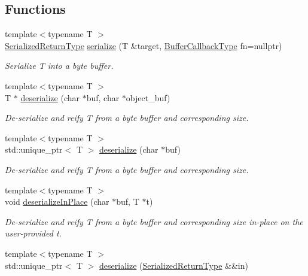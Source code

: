 \subsection*{Functions}
\begin{DoxyCompactItemize}
\item 
{\footnotesize template$<$typename T $>$ }\\\hyperlink{namespacecheckpoint_aa61e2b491f405a63a394f9aad528c37a}{Serialized\+Return\+Type} \hyperlink{namespacecheckpoint_a075da4e7344cf037943362517e606c3a}{serialize} (T \&target, \hyperlink{namespacecheckpoint_a70bc1b37eae8e32129df38d981ef90f6}{Buffer\+Callback\+Type} fn=nullptr)
\begin{DoxyCompactList}\small\item\em Serialize {\ttfamily T} into a byte buffer. \end{DoxyCompactList}\item 
{\footnotesize template$<$typename T $>$ }\\T $\ast$ \hyperlink{namespacecheckpoint_aee0d7387d339b0275e9b95634748d63b}{deserialize} (char $\ast$buf, char $\ast$object\+\_\+buf)
\begin{DoxyCompactList}\small\item\em De-\/serialize and reify {\ttfamily T} from a byte buffer and corresponding {\ttfamily size}. \end{DoxyCompactList}\item 
{\footnotesize template$<$typename T $>$ }\\std\+::unique\+\_\+ptr$<$ T $>$ \hyperlink{namespacecheckpoint_ab8beefac6b3dc40c69e11dc430618c64}{deserialize} (char $\ast$buf)
\begin{DoxyCompactList}\small\item\em De-\/serialize and reify {\ttfamily T} from a byte buffer and corresponding {\ttfamily size}. \end{DoxyCompactList}\item 
{\footnotesize template$<$typename T $>$ }\\void \hyperlink{namespacecheckpoint_af605968a3b8731448c68e5c9fff917ee}{deserialize\+In\+Place} (char $\ast$buf, T $\ast$t)
\begin{DoxyCompactList}\small\item\em De-\/serialize and reify {\ttfamily T} from a byte buffer and corresponding {\ttfamily size} in-\/place on the user-\/provided {\ttfamily t}. \end{DoxyCompactList}\item 
{\footnotesize template$<$typename T $>$ }\\std\+::unique\+\_\+ptr$<$ T $>$ \hyperlink{namespacecheckpoint_a1fa5c2e70f11308a1a94b163924d88f3}{deserialize} (\hyperlink{namespacecheckpoint_aa61e2b491f405a63a394f9aad528c37a}{Serialized\+Return\+Type} \&\&in)

\end{DoxyCompactItemize}
